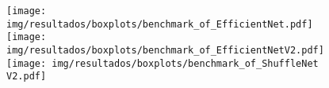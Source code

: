 \begin{figure}[h!]
	\texttt{[image: img/resultados/boxplots/benchmark\_of\_EfficientNet.pdf]}
	\texttt{[image: img/resultados/boxplots/benchmark\_of\_EfficientNetV2.pdf]}
	\texttt{[image: img/resultados/boxplots/benchmark\_of\_ShuffleNet V2.pdf]}
	\caption{}
	\label{fig:Time_of_Efficiency Oriented}
\end{figure}

